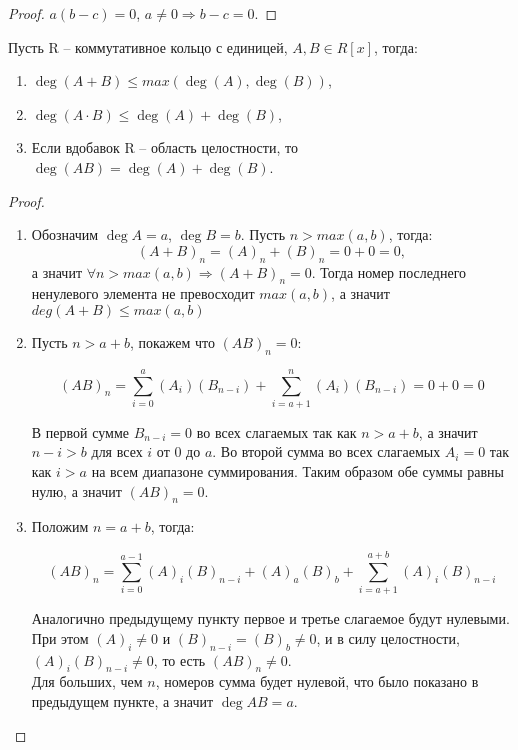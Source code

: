 \begin{proof}
    $a(b-c) = 0$, $a \neq 0 \Rightarrow b-c = 0$.
\end{proof}

\begin{proposition}
    \label{pr1.3}
    Пусть R -- коммутативное кольцо с единицей, $A, B \in R[x]$, тогда:
    \begin{enumerate}
        \item $\deg(A+B) \leq max(\deg(A), \deg(B))$,
        \item $\deg(A \cdot B) \leq \deg(A) + \deg(B)$,
        \item Если вдобавок R -- область целостности, то $\deg(AB) = \deg(A) + \deg(B)$.
    \end{enumerate}
\end{proposition}

\begin{proof}~
    \begin{enumerate}
        \item Обозначим $\deg A = a$, $\deg B = b$. Пусть $n > max(a, b)$, тогда:
        $$(A+B)_n = (A)_n + (B)_n = 0 + 0 = 0,$$ а значит $\forall n > max(a, b) \Rightarrow (A+B)_n = 0$. 
        Тогда номер последнего ненулевого элемента не превосходит $max(a, b)$, а значит 
        $deg(A+B) \leqslant max(a, b)$

        \item Пусть $n > a + b$, покажем что $(AB)_n = 0$:
        
        $$(AB)_n = \sum_{i = 0}^{a}(A_i)(B_{n-i}) + \sum_{i = a+1}^{n}(A_i)(B_{n-i}) = 0 + 0 = 0$$

        В первой сумме $B_{n-i} = 0$ во всех слагаемых так как $n > a + b$, а значит $n - i > b$ для
        всех $i$ от $0$ до $a$. Во второй сумма во всех слагаемых $A_i = 0$ так как $i > a$ на всем
        диапазоне суммирования. Таким образом обе суммы равны нулю, а значит $(AB)_n = 0$.

        \item Положим $n = a + b$, тогда:
        
        $$(AB)_{n} = \sum_{i=0}^{a-1} (A)_i(B)_{n-i} + (A)_a(B)_b + \sum_{i=a+1}^{a+b} (A)_i(B)_{n-i}$$

        Аналогично предыдущему пункту первое и третье слагаемое будут нулевыми. 
        При этом $(A)_i \neq 0$ и $(B)_{n-i} = (B)_b \neq 0$,  и в силу целостности, 
        $(A)_i(B)_{n-i} \neq 0$, то есть $(AB)_{n} \neq 0$. \\ Для больших,
        чем $n$, номеров сумма будет нулевой, что было показано в предыдущем пункте, 
        а значит $\deg AB = a$.
    \end{enumerate}
\end{proof}

